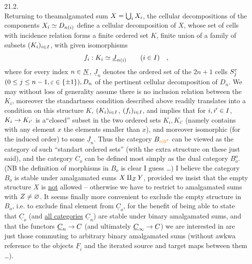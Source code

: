 
\hfill 21.2.\\

 Returning to theamalgamated sum $X=\bigcup_iX_i$, the cellular decompositions of the components $X_i\simeq D_{n(i)}$ define a cellular decomposition of $X$, whose set of cells with incidence relation forms a finite ordered set $K$, finite union of a family of subsets $(K_i)_{i\in I}$, with given isomorphisms
\[
f_i:K_i\simeq\underline{J}_{n(i)}\qquad(i\in I)\quad ,
\]
where for every index $n\in\underline{N}$, $\underline{J}_n$ denotes the ordered set of the $2n+1$ cells $S_j^{\varepsilon}$ $(0\leq j\leq n-1,\varepsilon\in\{\pm1\}),D_n$ of the pertinent cellular decomposition of $D_n$. We may without loss of generality assume there is no inclusion relation between the $K_i$, moreover the standartness condition described above readily translates into a condition on this structure $K$, $(K_i)_{i\in I}$, $(f_i)_{i\in I}$, and implies that for $i,i'\in I$, $K_i\to K_{i'}$ is a``closed'' subset in the two ordered sets $K_i,K_{i'}$ (namely contains with any element $x$ the elements smaller than $x$), and moreover isomorphic (for the induced order) to some $\underline{J}_n$. Thus the category $B_{\unsure{o|0}}$  can be viewed as the category of such ``standart ordered sets'' (with the extra structure on these just said), and the category $C_o$ can be defined most simply as the dual category $B_o^{o}$. (NB the definition of morphisms in $B_o$ is clear I guess \ldots) I believe the category $B_o$ is stable under amalgamated sums $X\amalg_ZY$, provided  we insist that the empty structure $X$ is \uline{not} allowed -- otherwise we have to  restrict to amalgamated sums with $Z\ne\varnothing$. It seems finally more convenient to exclude the empty structure in $B_o$, i.e. to exclude final element from $\underline{C}_o$, for the benefit of being able to state that $\underline{C}_o$ (and \uline{all categories} $\underline{C}_n$\handwritten{*})  are stable under binary amalgamated sums, and that the functors $\underline{C}_n\to C$ (and ultimately $\underline{C}_{\infty}\to C$) we are interested in are just those commuting to arbitrary binary amalgamated sums (without  awkwa reference to the objects $\underline{F}_i$ and the iterated source and target maps between them \ldots).


